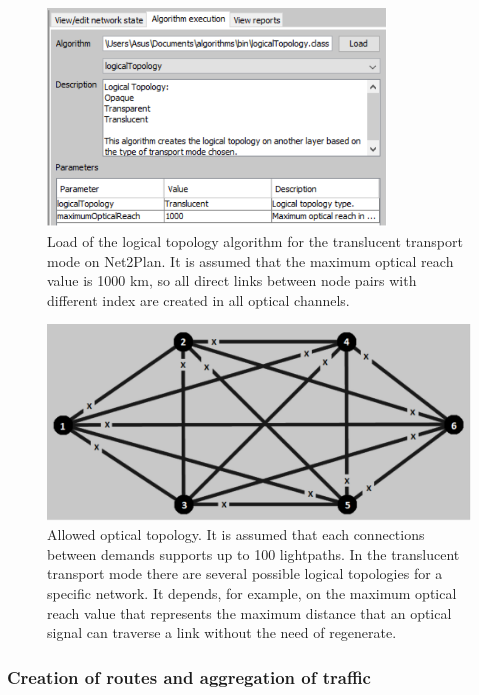 \begin{figure}[H]
\centering
\includegraphics[width=9cm]{sdf/heuristic/translucent_protection/figures/logical_topology_load_translucent}
\caption{Load of the logical topology algorithm for the translucent transport mode on Net2Plan. It is assumed that the maximum optical reach value is 1000 km, so all direct links between node pairs with different index are created in all optical channels.}
\label{logical_topology_load_translucent_protec}
\end{figure}

\begin{figure}[H]
\centering
\includegraphics[width=12cm]{sdf/heuristic/translucent_protection/figures/allowed_optical}
\caption{Allowed optical topology. It is assumed that each connections between demands supports up to 100 lightpaths. In the translucent transport mode there are several possible logical topologies for a specific network. It depends, for example, on the maximum optical reach value that represents the maximum distance that an optical signal can traverse a link without the need of regenerate.}
\label{allowed_optical_protec_translucent}
\end{figure}

\subsubsection{Creation of routes and aggregation of traffic}

